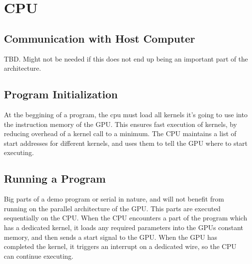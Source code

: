 \chapter{CPU}



\section{Communication with Host Computer}
TBD. Might not be needed if this does not end up being an important part of the architecture.



\section{Program Initialization}
At the beggining of a program, the cpu must load all kernels it's going to use into the instruction memory of the GPU. This ensures fast execution of kernels, by reducing overhead of a kernel call to a minimum.
The CPU maintains a list of start addresses for different kernels, and uses them to tell the GPU where to start executing.

\section{Running a Program}
Big parts of a demo program or serial in nature, and will not benefit from running on the parallel architecture of the GPU.
This parts are executed sequentially on the CPU.
When the CPU encounters a part of the program which has a dedicated kernel,
it loads any required parameters into the GPUs constant memory, and then sends a start signal to the GPU.
When the GPU has completed the kernel, it triggers an interrupt on a dedicated wire,
so the CPU can continue executing.
